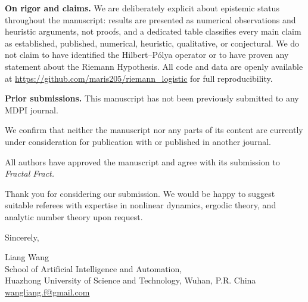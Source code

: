 \documentclass[11pt]{article}
\begin{document}
\vspace{0.1em}

\noindent\textbf{On rigor and claims.} We are deliberately explicit about epistemic status throughout the manuscript: results are presented as numerical observations and heuristic arguments, not proofs, and a dedicated table classifies every main claim as established, published, numerical, heuristic, qualitative, or conjectural. We do not claim to have identified the Hilbert--P\'olya operator or to have proven any statement about the Riemann Hypothesis. All code and data are openly available at \url{https://github.com/maris205/riemann_logistic} for full reproducibility.

\vspace{0.1em}

\noindent\textbf{Prior submissions.} This manuscript has not been previously submitted to any MDPI journal.

\vspace{0.1em}

\noindent We confirm that neither the manuscript nor any parts of its content are currently under consideration for publication with or published in another journal.

\vspace{0.1em}

\noindent All authors have approved the manuscript and agree with its submission to \textit{Fractal Fract.}

\vspace{0.15em}

\noindent Thank you for considering our submission. We would be happy to suggest suitable referees with expertise in nonlinear dynamics, ergodic theory, and analytic number theory upon request.

\vspace{0.1em}

\noindent Sincerely,

\vspace{0.15em}

\noindent Liang Wang \\
School of Artificial Intelligence and Automation, \\
Huazhong University of Science and Technology, Wuhan, P.R. China \\
\href{mailto:wangliang.f@gmail.com}{wangliang.f@gmail.com}
\end{document}
